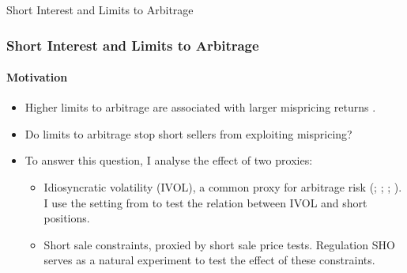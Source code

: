\documentclass{beamer}
\begin{document}
\begin{frame}
\begin{center}
\Large Short Interest and Limits to Arbitrage
\end{center}

\end{frame}
\begin{frame}
	\frametitle{Short Interest and Limits to Arbitrage}
		\framesubtitle{Motivation}
	\begin{itemize}
		\item Higher limits to arbitrage are associated with larger mispricing returns \citep{Stambaugh2015,Chu2016}. 
		\item Do limits to arbitrage stop short sellers from exploiting mispricing?
		\item To answer this question, I analyse the effect of two proxies:
		\begin{itemize}
		\item Idiosyncratic volatility (IVOL), a common proxy for arbitrage risk (\citet{Shleifer1997}; \citet{Pontiff2006}; \citet{Stambaugh2015}; \citet{Drechsler2016}). I use the setting from \citet{Stambaugh2015} to test the relation between IVOL and short positions.
		\item Short sale constraints, proxied by short sale price tests. Regulation SHO serves as a natural experiment to test the effect of these constraints.
		\end{itemize}
	\end{itemize}
\end{frame}  
\end{document}
